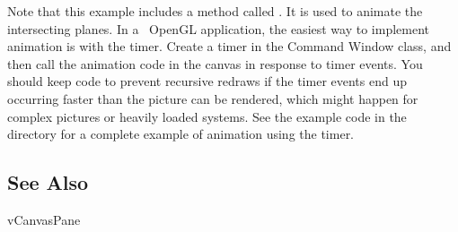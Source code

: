 Note that this example includes a method called .
It is used to animate the intersecting planes. In a \V\
OpenGL application, the easiest way to implement animation
is with the timer. Create a timer in the Command Window
class, and then call the animation code in the canvas
in response to timer events. You should keep code to
prevent recursive redraws if the timer events end up
occurring faster than the picture can be rendered, which
might happen for complex pictures or heavily loaded systems.
See the example code in the  directory for
a complete example of animation using the timer.

\subsection* {See Also} %

vCanvasPane
